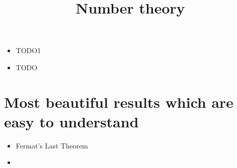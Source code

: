 \documentclass[12pt]{article}
\title{Number theory}
\begin{document}
\begin{itemize}
  \item TODO1 
  \item TODO
\end{itemize}
\newpage

\tableofcontents
\newpage

\section{Most beautiful results which are easy to understand} \label{beauty}

\begin{itemize}
    \item Fermat's Last Theorem
    \item 
\end{itemize}
\end{document}
